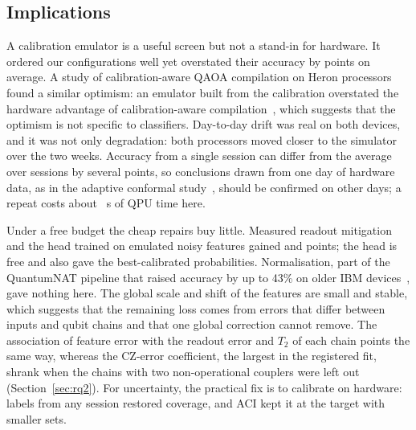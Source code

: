 \subsection{Implications}
\label{sec:implications}
A calibration emulator is a useful screen but not a stand-in for hardware. It ordered our
configurations well yet overstated their accuracy by  points on average. %
A study of calibration-aware QAOA compilation on Heron processors found a similar optimism: an
emulator built from the calibration overstated the hardware advantage of calibration-aware
compilation~\cite{qaoa2026drift}, which suggests that the optimism is not specific to
classifiers. Day-to-day drift was real on both devices, and it was not only degradation: both
processors moved closer to the simulator over the two weeks. %
Accuracy from a single session can differ from the average over sessions by several points, so
conclusions drawn from one day of hardware data, as in the adaptive conformal
study~\cite{spencer2026aqcp}, should be confirmed on other days; a repeat costs about
~s of QPU time here.

Under a free budget the cheap repairs buy little. Measured readout mitigation and the head
trained on emulated noisy features gained  and  points; %
the head is free and also gave the best-calibrated probabilities. %
Normalisation, part of the QuantumNAT pipeline that raised accuracy by up to 43\% on older IBM
devices~\cite{wang2022quantumnat}, gave nothing here. %
The global scale and shift of the features are small and stable, %
which suggests that the remaining loss comes from errors that differ between inputs and qubit
chains and that one global correction cannot remove. The association of feature error with the
readout error and $T_2$ of each chain points the same way, %
whereas the CZ-error coefficient, the largest in the registered fit, shrank when the chains
with two non-operational couplers were left out (Section~\ref{sec:rq2}). %
For uncertainty, the practical fix is to calibrate on hardware: labels from any session
restored coverage, and ACI kept it at the target with smaller sets. %

